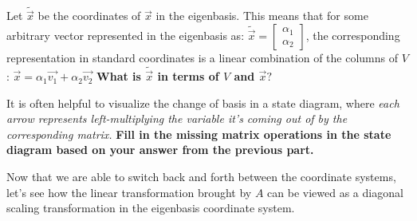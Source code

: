 \begin{enumerate}[resume]

\qitem Let $\widetilde{\vec{x}}$ be the coordinates of $\vec{x}$ in the eigenbasis. This means that for some arbitrary vector represented in the eigenbasis as: $\widetilde{\vec{x}} = \begin{bmatrix} \alpha_1 \\ \alpha_2 \end{bmatrix}$, the corresponding representation in standard coordinates is a linear combination of the columns of $V$: $\vec{x} = \alpha_1 \vec{v_1} + \alpha_2 \vec{v_2}$ \textbf{What is $\widetilde{\vec{x}}$ in terms of $V$ and $\vec{x}?$}
\vspace{3em}



\qitem It is often helpful to visualize the change of basis in a state diagram, where \textit{each arrow represents left-multiplying the variable it's coming out of by the corresponding matrix.} \textbf{Fill in the missing matrix operations in the state diagram based on your answer from the previous part.}

\begin{figure}[H]
  \centering
\end{figure}

\meta{}
\sol{}

\qitem Now that we are able to switch back and forth between the coordinate systems, let's see how the linear transformation brought by $A$ can be viewed as a diagonal scaling transformation in the eigenbasis coordinate system. %


\end{enumerate}
